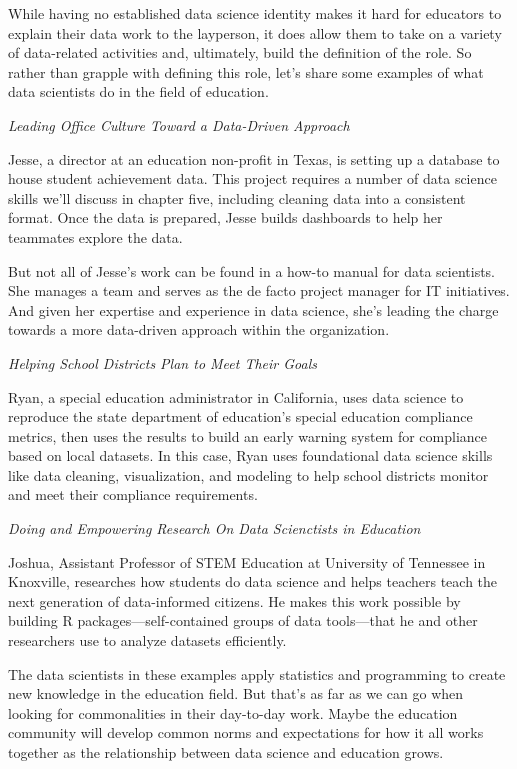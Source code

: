 \documentclass[]{book}
\begin{document}
While having no established data science identity makes it hard for
educators to explain their data work to the layperson, it does allow
them to take on a variety of data-related activities and, ultimately,
build the definition of the role. So rather than grapple with defining
this role, let's share some examples of what data scientists do in the
field of education.

\emph{Leading Office Culture Toward a Data-Driven Approach}

Jesse, a director at an education non-profit in Texas, is setting up a
database to house student achievement data. This project requires a
number of data science skills we'll discuss in chapter five, including
cleaning data into a consistent format. Once the data is prepared, Jesse
builds dashboards to help her teammates explore the data.

But not all of Jesse's work can be found in a how-to manual for data
scientists. She manages a team and serves as the de facto project
manager for IT initiatives. And given her expertise and experience in
data science, she's leading the charge towards a more data-driven
approach within the organization.

\emph{Helping School Districts Plan to Meet Their Goals}

Ryan, a special education administrator in California, uses data science
to reproduce the state department of education's special education
compliance metrics, then uses the results to build an early warning
system for compliance based on local datasets. In this case, Ryan uses
foundational data science skills like data cleaning, visualization, and
modeling to help school districts monitor and meet their compliance
requirements.

\emph{Doing and Empowering Research On Data Scienctists in Education}

Joshua, Assistant Professor of STEM Education at University of Tennessee
in Knoxville, researches how students do data science and helps teachers
teach the next generation of data-informed citizens. He makes this work
possible by building R packages---self-contained groups of data
tools---that he and other researchers use to analyze datasets
efficiently.

The data scientists in these examples apply statistics and programming
to create new knowledge in the education field. But that's as far as we
can go when looking for commonalities in their day-to-day work. Maybe
the education community will develop common norms and expectations for
how it all works together as the relationship between data science and
education grows.
\end{document}
